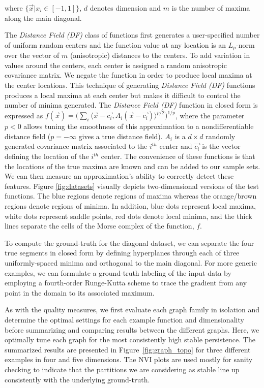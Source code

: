 where $\{\vec{x}|x_i\in [-1,1]\}$, $d$ denotes dimension and $m$ is the number of maxima along the main diagonal.

The \emph{Distance Field (DF)} class of functions first generates a user-specified number of uniform random centers and the function value at any location is an $L_p$-norm over the vector of $m$ (anisotropic) distances to the centers.
%
To add variation in values around the centers, each center is assigned a random anisotropic covariance matrix.
%
We negate the function in order to produce local maxima at the center locations.
%
This technique of generating \emph{Distance Field (DF)} functions produces a local maxima at each center but makes it difficult to control the number of minima generated.
%
The \emph{Distance Field (DF)} function in closed form is expressed as $f(\vec{x}) = \bigl(\sum_i \langle\vec{x}-\vec{c_i},A_i(\vec{x}-\vec{c_i})\rangle^{p/2}\bigr)^{1/p}$, where the parameter $p < 0$ allows tuning the smoothness of this approximation to a nondifferentiable distance field ($p = -\infty$ gives a true distance field).
%
$A_i$ is a $d \times d$ randomly generated covariance matrix associated to the $i^{th}$ center and $\vec{c_i}$ is the vector defining the location of the $i^{th}$ center.
%
The convenience of these functions is that the locations of the true maxima are known and can be added to our sample sets.
%
We can then measure an approximation's ability to correctly detect these features.
%
Figure \ref{fig:datasets} visually depicts two-dimensional versions of the test functions.
%
The blue regions denote regions of maxima whereas the orange/brown regions denote regions of minima.
In addition, blue dots represent local maxima, white dots represent saddle points, red dots denote local minima, and the thick lines separate the cells
of the Morse complex of the function, $f$.

To compute the ground-truth for the diagonal dataset, we can separate the four true segments in closed form by defining hyperplanes through each of three uniformly-spaced minima and orthogonal to the main diagonal.
%
For more generic examples, we can formulate a ground-truth labeling of the input data by employing a fourth-order Runge-Kutta scheme to trace the gradient from any point in the domain to its associated maximum.

As with the quality measures, we first evaluate each graph family in isolation and determine the optimal settings for each example function and dimensionality before summarizing and comparing results between the different graphs.
%
Here, we optimally tune each graph for the most consistently high stable persistence.
%
The summarized results are presented in Figure~\ref{fig:graph_topo} for three different examples in four and five dimensions.
%
The NVI plots are used mostly for sanity checking to indicate that the partitions we are considering as stable line up consistently with the underlying ground-truth.

